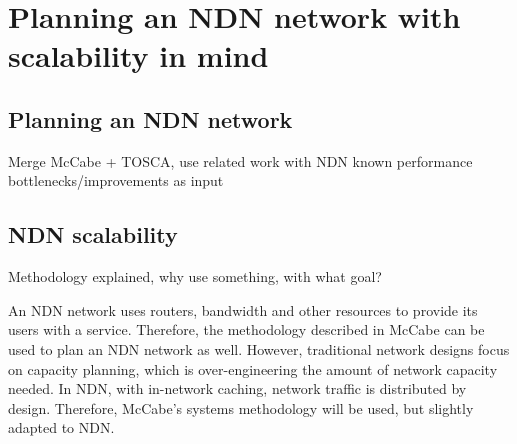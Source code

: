 \section{Planning an NDN network with scalability in mind}
\subsection{Planning an NDN network}
\label{method-planning}
Merge McCabe + TOSCA, use related work with NDN known performance bottlenecks/improvements as input

\subsection{NDN scalability}
Methodology explained, why use something, with what goal?

An NDN network uses routers, bandwidth and other resources to provide its users with a service. Therefore, the methodology described in McCabe can be used to plan an NDN network as well. However, traditional network designs focus on capacity planning, which is over-engineering the amount of network capacity needed. In NDN, with in-network caching, network traffic is distributed by design. Therefore, McCabe's systems methodology will be used, but slightly adapted to NDN. 
